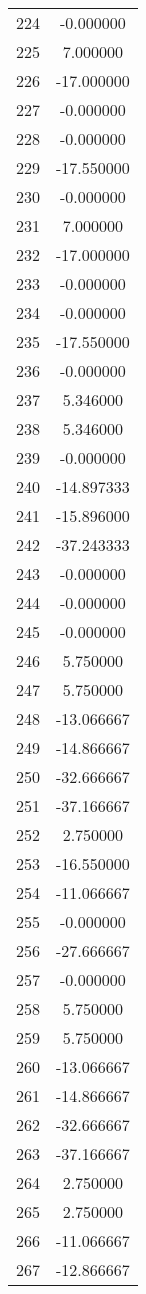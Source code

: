 \documentclass[12pt]{article}
\begin{document}
\begin{longtable}{@{}cc@{}}
224 & -0.000000 \\
225 & 7.000000 \\
226 & -17.000000 \\
227 & -0.000000 \\
228 & -0.000000 \\
229 & -17.550000 \\
230 & -0.000000 \\
231 & 7.000000 \\
232 & -17.000000 \\
233 & -0.000000 \\
234 & -0.000000 \\
235 & -17.550000 \\
236 & -0.000000 \\
237 & 5.346000 \\
238 & 5.346000 \\
239 & -0.000000 \\
240 & -14.897333 \\
241 & -15.896000 \\
242 & -37.243333 \\
243 & -0.000000 \\
244 & -0.000000 \\
245 & -0.000000 \\
246 & 5.750000 \\
247 & 5.750000 \\
248 & -13.066667 \\
249 & -14.866667 \\
250 & -32.666667 \\
251 & -37.166667 \\
252 & 2.750000 \\
253 & -16.550000 \\
254 & -11.066667 \\
255 & -0.000000 \\
256 & -27.666667 \\
257 & -0.000000 \\
258 & 5.750000 \\
259 & 5.750000 \\
260 & -13.066667 \\
261 & -14.866667 \\
262 & -32.666667 \\
263 & -37.166667 \\
264 & 2.750000 \\
265 & 2.750000 \\
266 & -11.066667 \\
267 & -12.866667 \\

\end{longtable}
\end{document}
